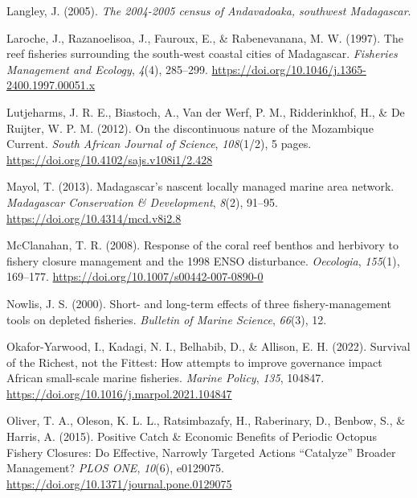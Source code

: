 \documentclass[
]{article}
\newlength{\cslhangindent}
\newlength{\cslentryspacingunit} %
\newenvironment{CSLReferences}[2] %
 {%
  \setlength{\parindent}{0pt}
  \ifodd #1
  \let\oldpar\par
  \def\par{\hangindent=\cslhangindent\oldpar}
  \fi
  \setlength{\parskip}{#2\cslentryspacingunit}
 }%
 {}
\begin{document}
\begin{CSLReferences}{1}{2}
\leavevmode{}%
Langley, J. (2005). \emph{The 2004-2005 census of {Andavadoaka}, southwest {Madagascar}}.

\leavevmode{}%
Laroche, J., Razanoelisoa, J., Fauroux, E., \& Rabenevanana, M. W. (1997). The reef fisheries surrounding the south‐west coastal cities of {Madagascar}. \emph{Fisheries Management and Ecology}, \emph{4}(4), 285--299. \url{https://doi.org/10.1046/j.1365-2400.1997.00051.x}

\leavevmode{}%
Lutjeharms, J. R. E., Biastoch, A., Van der Werf, P. M., Ridderinkhof, H., \& De Ruijter, W. P. M. (2012). On the discontinuous nature of the {Mozambique} {Current}. \emph{South African Journal of Science}, \emph{108}(1/2), 5 pages. \url{https://doi.org/10.4102/sajs.v108i1/2.428}

\leavevmode{}%
Mayol, T. (2013). Madagascar's nascent locally managed marine area network. \emph{Madagascar Conservation \& Development}, \emph{8}(2), 91--95. \url{https://doi.org/10.4314/mcd.v8i2.8}

\leavevmode{}%
McClanahan, T. R. (2008). Response of the coral reef benthos and herbivory to fishery closure management and the 1998 {ENSO} disturbance. \emph{Oecologia}, \emph{155}(1), 169--177. \url{https://doi.org/10.1007/s00442-007-0890-0}

\leavevmode{}%
Nowlis, J. S. (2000). Short- and long-term effects of three fishery-management tools on depleted fisheries. \emph{Bulletin of Marine Science}, \emph{66}(3), 12.

\leavevmode{}%
Okafor-Yarwood, I., Kadagi, N. I., Belhabib, D., \& Allison, E. H. (2022). Survival of the {Richest}, not the {Fittest}: {How} attempts to improve governance impact {African} small-scale marine fisheries. \emph{Marine Policy}, \emph{135}, 104847. \url{https://doi.org/10.1016/j.marpol.2021.104847}

\leavevmode{}%
Oliver, T. A., Oleson, K. L. L., Ratsimbazafy, H., Raberinary, D., Benbow, S., \& Harris, A. (2015). Positive {Catch} \& {Economic} {Benefits} of {Periodic} {Octopus} {Fishery} {Closures}: {Do} {Effective}, {Narrowly} {Targeted} {Actions} {``{Catalyze}''} {Broader} {Management}? \emph{PLOS ONE}, \emph{10}(6), e0129075. \url{https://doi.org/10.1371/journal.pone.0129075}


\end{CSLReferences}
\end{document}
